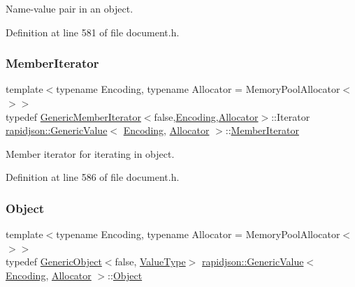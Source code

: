 Name-\/value pair in an object. 



Definition at line 581 of file document.\+h.

\mbox{\label{classrapidjson_1_1_generic_value_aca5596987335016c1a7c2a9467baf80b}} 
\subsubsection{\texorpdfstring{MemberIterator}{MemberIterator}}
{\footnotesize\ttfamily template$<$typename Encoding, typename Allocator = Memory\+Pool\+Allocator$<$$>$$>$ \\
typedef \mbox{\hyperlink{classrapidjson_1_1_generic_member_iterator}{Generic\+Member\+Iterator}}$<$false,\mbox{\hyperlink{classrapidjson_1_1_encoding}{Encoding}},\mbox{\hyperlink{classrapidjson_1_1_allocator}{Allocator}}$>$\+::Iterator \mbox{\hyperlink{classrapidjson_1_1_generic_value}{rapidjson\+::\+Generic\+Value}}$<$ \mbox{\hyperlink{classrapidjson_1_1_encoding}{Encoding}}, \mbox{\hyperlink{classrapidjson_1_1_allocator}{Allocator}} $>$\+::\mbox{\hyperlink{classrapidjson_1_1_generic_value_aca5596987335016c1a7c2a9467baf80b}{Member\+Iterator}}}



Member iterator for iterating in object. 



Definition at line 586 of file document.\+h.

\mbox{\label{classrapidjson_1_1_generic_value_ae1b1a60a9c69ce5ac48b8c445e3e9231}} 
\subsubsection{\texorpdfstring{Object}{Object}}
{\footnotesize\ttfamily template$<$typename Encoding, typename Allocator = Memory\+Pool\+Allocator$<$$>$$>$ \\
typedef \mbox{\hyperlink{classrapidjson_1_1_generic_object}{Generic\+Object}}$<$false, \mbox{\hyperlink{classrapidjson_1_1_generic_value_ad2935191ab28c2c2e472b739a9d58202}{Value\+Type}}$>$ \mbox{\hyperlink{classrapidjson_1_1_generic_value}{rapidjson\+::\+Generic\+Value}}$<$ \mbox{\hyperlink{classrapidjson_1_1_encoding}{Encoding}}, \mbox{\hyperlink{classrapidjson_1_1_allocator}{Allocator}} $>$\+::\mbox{\hyperlink{classrapidjson_1_1_generic_value_ae1b1a60a9c69ce5ac48b8c445e3e9231}{Object}}}



